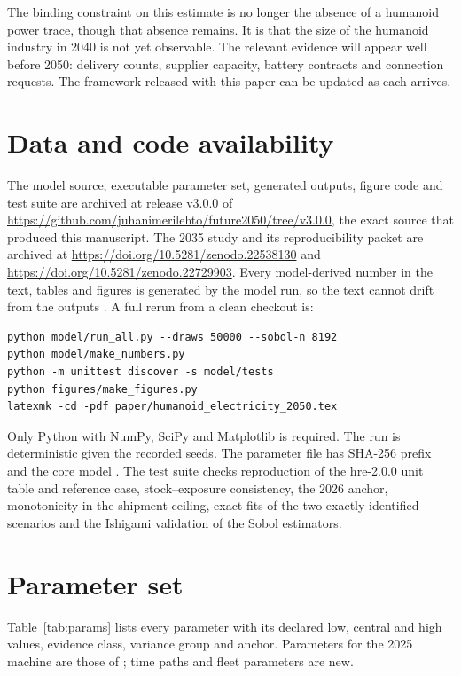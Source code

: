 \documentclass[11pt]{article}
\newcommand{\tabref}[1]{Table~\ref{#1}}
\begin{document}
The binding constraint on this estimate is no longer the absence of a humanoid power trace, though that absence remains. It is that the size of the humanoid industry in 2040 is not yet observable. The relevant evidence will appear well before 2050: delivery counts, supplier capacity, battery contracts and connection requests. The framework released with this paper can be updated as each arrives.

\section*{Data and code availability}
The model source, executable parameter set, generated outputs, figure code and test suite are archived at release v3.0.0 of \url{https://github.com/juhanimerilehto/future2050/tree/v3.0.0}, the exact source that produced this manuscript. The 2035 study and its reproducibility packet are archived at \url{https://doi.org/10.5281/zenodo.22538130} and \url{https://doi.org/10.5281/zenodo.22729903}. Every model-derived number in the text, tables and figures is generated by the model run, so the text cannot drift from the outputs \citep{pfenninger2017}. A full rerun from a clean checkout is:
\begin{verbatim}
python model/run_all.py --draws 50000 --sobol-n 8192
python model/make_numbers.py
python -m unittest discover -s model/tests
python figures/make_figures.py
latexmk -cd -pdf paper/humanoid_electricity_2050.tex
\end{verbatim}
Only Python with NumPy, SciPy and Matplotlib is required. The run is deterministic given the recorded seeds. The parameter file has SHA-256 prefix \texttt{\ParamsSha} and the core model \texttt{\CoreSha}. The test suite checks reproduction of the hre-2.0.0 unit table and reference case, stock--exposure consistency, the 2026 anchor, monotonicity in the shipment ceiling, exact fits of the two exactly identified scenarios and the Ishigami validation of the Sobol estimators.




\appendix
\section{Parameter set}\label{app:params}
\tabref{tab:params} lists every parameter with its declared low, central and high values, evidence class, variance group and anchor. Parameters for the 2025 machine are those of \citet{merilehto2026a}; time paths and fleet parameters are new.
\end{document}
